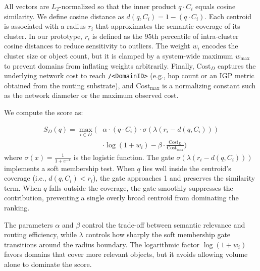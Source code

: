 \documentclass[journal]{IEEEtran}
\begin{document}
All vectors are $L_2$-normalized so that the inner product $q \cdot C_i$ equals cosine similarity.
We define cosine distance as $d(q, C_i) = 1 - (q \cdot C_i)$.
Each centroid is associated with a radius $r_i$ that approximates the semantic coverage of its cluster.
In our prototype, $r_i$ is defined as the 95th percentile of intra-cluster cosine distances to reduce sensitivity to outliers.
The weight $w_i$ encodes the cluster size or object count, but it is clamped by a system-wide maximum $w_{\max}$ to prevent domains from inflating weights arbitrarily.
Finally, $\text{Cost}_D$ captures the underlying network cost to reach \texttt{/<DomainID>} (e.g., hop count or an IGP metric obtained from the routing substrate), and $\text{Cost}_{\max}$ is a normalizing constant such as the network diameter or the maximum observed cost.

We compute the score as:

\begin{equation}
\label{eq:score}
\begin{split}
    S_D(q) = \max_{i \in D} \bigg( & \alpha \cdot (q \cdot C_i) \cdot \sigma(\lambda(r_i - d(q, C_i))) \\
    & \cdot \log(1+w_i) - \beta \cdot \frac{\text{Cost}_D}{\text{Cost}_{\max}} \bigg)
\end{split}
\end{equation}
where $\sigma(x)=\frac{1}{1+e^{-x}}$ is the logistic function.
The gate $\sigma(\lambda(r_i - d(q, C_i)))$ implements a soft membership test.
When $q$ lies well inside the centroid's coverage (i.e., $d(q,C_i) < r_i$), the gate approaches 1 and preserves the similarity term.
When $q$ falls outside the coverage, the gate smoothly suppresses the contribution, preventing a single overly broad centroid from dominating the ranking.

The parameters $\alpha$ and $\beta$ control the trade-off between semantic relevance and routing efficiency, while $\lambda$ controls how sharply the soft membership gate transitions around the radius boundary.
The logarithmic factor $\log(1+w_i)$ favors domains that cover more relevant objects, but it avoids allowing volume alone to dominate the score.
\end{document}
